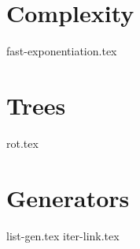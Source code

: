 \documentclass{exam}
\begin{document}
\section{Complexity}
\begin{questions}
{fast-exponentiation.tex}
\end{questions}

\section{Trees}
\begin{questions}
{rot.tex}
\end{questions}


\section{Generators}
\begin{questions}
{list-gen.tex}
{iter-link.tex}
\end{questions}
\end{document}
